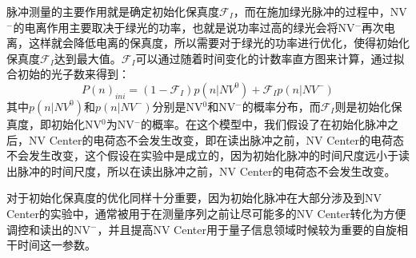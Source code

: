 \documentclass[type = bachelor]{whu-thesis}
\begin{document}
脉冲测量的主要作用就是确定初始化保真度$\mathcal{F}_I$，而在施加绿光脉冲的过程中，NV$^-$的电离作用主要取决于绿光的功率，也就是说功率过高的绿光会将NV$^-$再次电离，这样就会降低电离的保真度，所以需要对于绿光的功率进行优化，使得初始化保真度$\mathcal{F}_I$达到最大值。$\mathcal{F}_I$可以通过随着时间变化的计数率直方图来计算，通过拟合初始的光子数来得到：
\begin{equation}
  P(n)_{ini}=(1-\mathcal{F}_I)p(n|NV^0)+\mathcal{F}_Ip(n|NV^-)
\end{equation}
其中$p(n|NV^0)$和$p(n|NV^-)$分别是NV$^0$和NV$^-$的概率分布，而$\mathcal{F}_I$则是初始化保真度，即初始化NV$^0$为NV$^-$的概率。在这个模型中，我们假设了在初始化脉冲之后，NV Center的电荷态不会发生改变，即在读出脉冲之前，NV Center的电荷态不会发生改变，这个假设在实验中是成立的，因为初始化脉冲的时间尺度远小于读出脉冲的时间尺度，所以在读出脉冲之前，NV Center的电荷态不会发生改变。

对于初始化保真度的优化同样十分重要，因为初始化脉冲在大部分涉及到NV Center的实验中，通常被用于在测量序列之前让尽可能多的NV Center转化为方便调控和读出的NV$^-$，并且提高NV Center用于量子信息领域时候较为重要的自旋相干时间这一参数\cite{robledo2011spin}。
\end{document}
